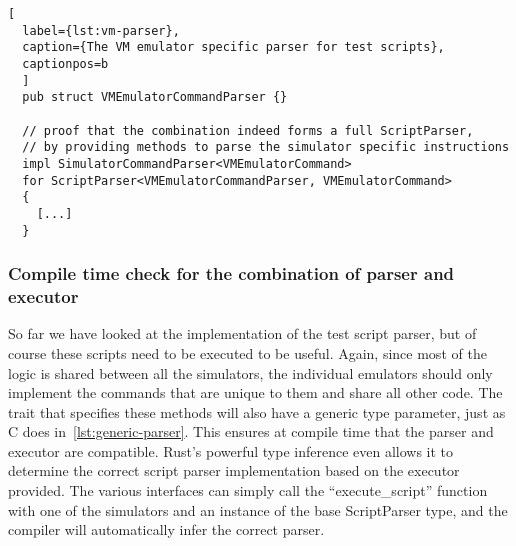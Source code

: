 \begin{lstlisting}[
  label={lst:vm-parser},
  caption={The VM emulator specific parser for test scripts},
  captionpos=b
  ]
  pub struct VMEmulatorCommandParser {}

  // proof that the combination indeed forms a full ScriptParser,
  // by providing methods to parse the simulator specific instructions
  impl SimulatorCommandParser<VMEmulatorCommand>
  for ScriptParser<VMEmulatorCommandParser, VMEmulatorCommand>
  {
    [...]
  }
\end{lstlisting}

\subsubsection{Compile time check for the combination of parser and executor}
So far we have looked at the implementation of the test script parser, but of course these scripts need to be executed to be useful.
Again, since most of the logic is shared between all the simulators, the individual emulators should only implement the commands that are unique to them and share all other code.
The trait that specifies these methods will also have a generic type parameter, just as C does in~\cref{lst:generic-parser}. This ensures at compile time that the parser and executor are compatible.
Rust's powerful type inference even allows it to determine the correct script parser implementation based on the executor provided. The various interfaces can simply call the ``execute\_script'' function with one of the simulators and an instance of the base ScriptParser type, and the compiler will automatically infer the correct parser.

